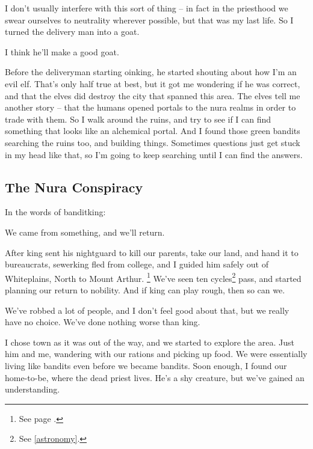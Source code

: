 \begin{multicols}{2}
\begin{exampletext}
  I don't usually interfere with this sort of thing -- in fact in the priesthood we swear ourselves to neutrality wherever possible, but that was my last life.
  So I turned the delivery man into a goat.

  I think he'll make a good goat.

  Before the deliveryman starting oinking, he started shouting about how I'm an evil elf.
  That's only half true at best, but it got me wondering if he was correct, and that the elves did destroy the city that spanned this area.
  The elves tell me another story -- that the humans opened portals to the nura realms in order to trade with them.
  So I walk around the ruins, and try to see if I can find something that looks like an alchemical portal.
  And I found those green bandits searching the ruins too, and building things.
  Sometimes questions just get stuck in my head like that, so I'm going to keep searching until I can find the answers.

\end{exampletext}

\subsection{The Nura Conspiracy}

In the words of \gls{banditking}:

\begin{exampletext}

  We came from something, and we'll return.

  After \gls{king} sent his \gls{nightguard} to kill our parents, take our land, and hand it to bureaucrats, \gls{sewerking} fled from \gls{college}, and I guided him safely out of Whiteplains, North to Mount Arthur.
  \footnote{See page \pageref{whiteplainsWar}.}
  We've seen ten cycles\footnote{See \autoref{astronomy}.} pass, and started planning our return to nobility.
  And if \gls{king} can play rough, then so can we.

  We've robbed a lot of people, and I don't feel good about that, but we really have no choice.
  We've done nothing worse than \gls{king}.

  I chose \gls{town} as it was out of the way, and we started to explore the area.
  Just him and me, wandering with our rations and picking up food.
  We were essentially living like bandits even before we became bandits.
  Soon enough, I found our home-to-be, where the dead priest lives.
  He's a shy creature, but we've gained an understanding.


\end{exampletext}
\end{multicols}
